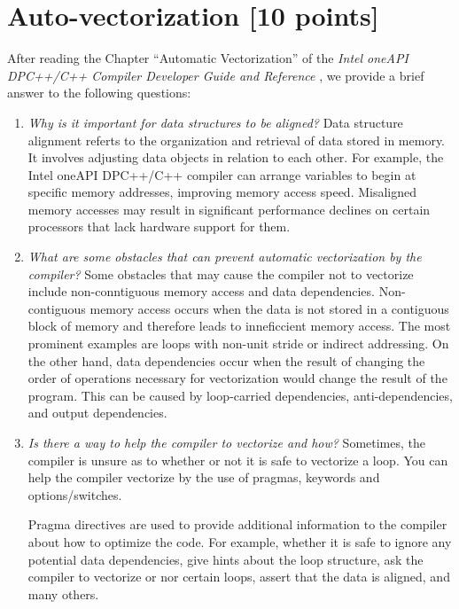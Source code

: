 \documentclass[unicode,11pt,a4paper,oneside,numbers=endperiod,openany]{scrartcl}
\begin{document}
\section{Auto-vectorization [10 points]}

After reading the Chapter “Automatic Vectorization” of the \textit{Intel oneAPI DPC++/C++ Compiler Developer
Guide and Reference} \cite{intel-oneapi}, we provide a brief answer to the following questions:

\begin{enumerate}
    \item \textit{Why is it important for data structures to be aligned?}
    Data structure alignment referts to the organization and retrieval of data stored in memory.
    It involves adjusting data objects in relation to each other.
    For example, the Intel oneAPI DPC++/C++ compiler can arrange variables to begin at specific
    memory addresses, improving memory access speed.
    Misaligned memory accesses may result in significant performance declines on certain processors
    that lack hardware support for them.

    \item \textit{What are some obstacles that can prevent automatic vectorization by the compiler?}
    Some obstacles that may cause the compiler not to vectorize include non-conntiguous memory access and
    data dependencies.
    Non-contiguous memory access occurs when the data is not stored in a contiguous block of memory and
    therefore leads to inneficcient memory access. The most prominent examples are loops with non-unit
    stride or indirect addressing.
    On the other hand, data dependencies occur when the result of changing the order of operations
    necessary for vectorization would change the result of the program. This can be caused by 
    loop-carried dependencies, anti-dependencies, and output dependencies.

    \item \textit{Is there a way to help the compiler to vectorize and how?}
    Sometimes, the compiler is unsure as to whether or not it is safe to vectorize a loop.
    You can help the compiler vectorize by the use of pragmas, keywords and options/switches.

    Pragma directives are used to provide additional information to the compiler about how to optimize the code.
    For example, whether it is safe to ignore any potential data dependencies, give hints about the loop structure,
    ask the compiler to vectorize or nor certain loops, assert that the data is aligned, and many others.


\end{enumerate}
\end{document}
